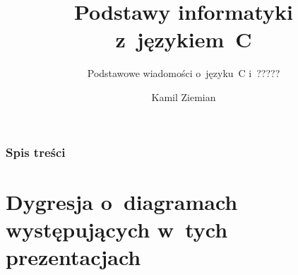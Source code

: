 \documentclass[10pt,t]{beamer}
\title{Podstawy informatyki z~językiem~C}
\subtitle{Podstawowe wiadomości o~języku~C i~?????}
\author{Kamil Ziemian \\
  \email}
\begin{document}





\RaggedRight





\maketitle





\begin{frame}
  \frametitle{Spis treści}


  \tableofcontents

\end{frame}





\section{Dygresja o~diagramach występujących w~tych
  prezentacjach}
\end{document}
